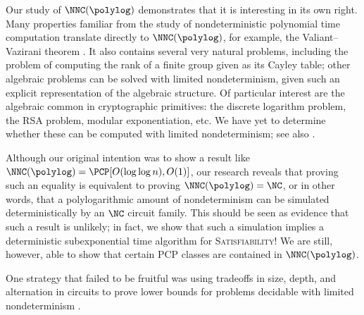 \documentclass{article}
\begin{document}
Our study of $\NNC(\polylog)$ demonstrates that it is interesting in its own right.
Many properties familiar from the study of nondeterministic polynomial time computation translate directly to $\NNC(\polylog)$, for example, the Valiant--Vazirani theorem \autocite{vv}.
It also contains several very natural problems, including the problem of computing the rank of a finite group given as its Cayley table; other algebraic problems can be solved with limited nondeterminism, given such an explicit representation of the algebraic structure.
Of particular interest are the algebraic common in cryptographic primitives: the discrete logarithm problem, the RSA problem, modular exponentiation, etc.
We have yet to determine whether these can be computed with limited nondeterminism; see also \autocite{timelock}.

Although our original intention was to show a result like $\NNC(\polylog) = \PCP[O(\log \log n), O(1)]$, our research reveals that proving such an equality is equivalent to proving $\NNC(\polylog) = \NC$, or in other words, that a polylogarithmic amount of nondeterminism can be simulated deterministically by an $\NC$ circuit family.
This should be seen as evidence that such a result is unlikely; in fact, we show that such a simulation implies a deterministic subexponential time algorithm for \textsc{Satisfiability}!
We are still, however, able to show that certain PCP classes are contained in $\NNC(\polylog)$.

One strategy that failed to be fruitful was using tradeoffs in size, depth, and alternation in circuits to prove lower bounds for problems decidable with limited nondeterminism \autocite{sizedepth}.

\end{document}
